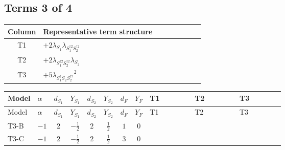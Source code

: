 \documentclass[8pt]{article}
\begin{document}
\begin{landscape}
\subsection*{Terms 3 of 4}
\begin{center}
\begin{tabular}{@{}c >{\raggedright\arraybackslash}p{0.82\linewidth}@{}}
\toprule
Column & Representative term structure \\
\midrule
T1 & \(\displaystyle +2 {\lambda_{S_1}} {\lambda_{S_1^{\dagger 2}S_2^{\dagger 2}}}\) \\
\midrule
T2 & \(\displaystyle +2 {\lambda_{S_1^{\dagger 2}S_2^{\dagger 2}}} {\lambda_{S_2}}\) \\
\midrule
T3 & \(\displaystyle +5 {\lambda_{S_1^\dagger S_2 S_2^{\dagger 2}}}^2\) \\
\midrule
\bottomrule
\end{tabular}
\end{center}
\smallskip
\tiny
\begin{longtable}{@{}llcccccc >{\raggedright\arraybackslash}p{0.21\linewidth} >{\raggedright\arraybackslash}p{0.21\linewidth} >{\raggedright\arraybackslash}p{0.21\linewidth}@{}}
\toprule
Model & $\alpha$ & $d_{S_1}$ & $Y_{S_1}$ & $d_{S_2}$ & $Y_{S_2}$ & $d_F$ & $Y_F$ & T1 & T2 & T3 \\
\midrule
\endfirsthead
\toprule
Model & $\alpha$ & $d_{S_1}$ & $Y_{S_1}$ & $d_{S_2}$ & $Y_{S_2}$ & $d_F$ & $Y_F$ & T1 & T2 & T3 \\
\midrule
\endhead
T3-B & $-1$ & $2$ & $-\frac{1}{2}$ & $2$ & $\frac{1}{2}$ & $1$ & $0$ & \scriptsize\adjustbox{max width=\linewidth}{$\begin{gathered} +2 {\lambda_{S_1}} {\lambda_{S_1^{\dagger 2}S_2^{\dagger 2}}}\end{gathered}$} & \scriptsize\adjustbox{max width=\linewidth}{$\begin{gathered} +2 {\lambda_{S_1^{\dagger 2}S_2^{\dagger 2}}} {\lambda_{S_2}}\end{gathered}$} & \scriptsize\adjustbox{max width=\linewidth}{$\begin{gathered} +5 {\lambda_{S_1^\dagger S_2 S_2^{\dagger 2}}}^2\end{gathered}$} \\
\midrule
T3-C & $-1$ & $2$ & $-\frac{1}{2}$ & $2$ & $\frac{1}{2}$ & $3$ & $0$ & \scriptsize\adjustbox{max width=\linewidth}{$\begin{gathered} +2 {\lambda_{S_1}} {\lambda_{S_1^{\dagger 2}S_2^{\dagger 2}}}\end{gathered}$} & \scriptsize\adjustbox{max width=\linewidth}{$\begin{gathered} +2 {\lambda_{S_1^{\dagger 2}S_2^{\dagger 2}}} {\lambda_{S_2}}\end{gathered}$} & \scriptsize\adjustbox{max width=\linewidth}{$\begin{gathered} +5 {\lambda_{S_1^\dagger S_2 S_2^{\dagger 2}}}^2\end{gathered}$} \\

\end{longtable}
\end{landscape}
\end{document}
